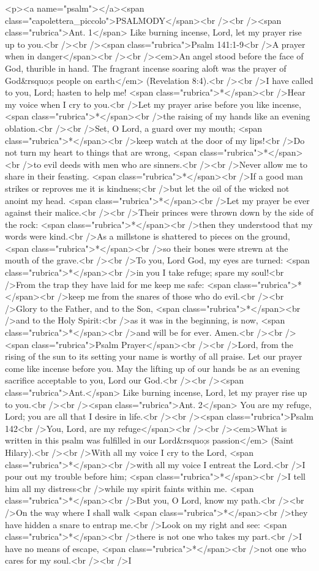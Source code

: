 <p><a name="psalm"></a><span class="capolettera_piccolo">PSALMODY</span><br /><br /><span class="rubrica">Ant. 1</span> Like burning incense, Lord, let my prayer rise up to you.<br /><br /><span class="rubrica">Psalm 141:1-9<br />A prayer when in danger</span><br /><br /><em>An angel stood before the face of God, thurible in hand. The fragrant incense soaring aloft was the prayer of God&rsquo;s people on earth</em> (Revelation 8:4).<br /><br />I have called to you, Lord; hasten to help me! <span class="rubrica">*</span><br />Hear my voice when I cry to you.<br />Let my prayer arise before you like incense, <span class="rubrica">*</span><br />the raising of my hands like an evening oblation.<br /><br />Set, O Lord, a guard over my mouth; <span class="rubrica">*</span><br />keep watch at the door of my lips!<br />Do not turn my heart to things that are wrong, <span class="rubrica">*</span><br />to evil deeds with men who are sinners.<br /><br />Never allow me to share in their feasting. <span class="rubrica">*</span><br />If a good man strikes or reproves me it is kindness;<br />but let the oil of the wicked not anoint my head. <span class="rubrica">*</span><br />Let my prayer be ever against their malice.<br /><br />Their princes were thrown down by the side of the rock: <span class="rubrica">*</span><br />then they understood that my words were kind.<br />As a millstone is shattered to pieces on the ground, <span class="rubrica">*</span><br />so their bones were strewn at the mouth of the grave.<br /><br />To you, Lord God, my eyes are turned: <span class="rubrica">*</span><br />in you I take refuge; spare my soul!<br />From the trap they have laid for me keep me safe: <span class="rubrica">*</span><br />keep me from the snares of those who do evil.<br /><br />Glory to the Father, and to the Son, <span class="rubrica">*</span><br />and to the Holy Spirit:<br />as it was in the beginning, is now, <span class="rubrica">*</span><br />and will be for ever. Amen.<br /><br /><span class="rubrica">Psalm Prayer</span><br /><br />Lord, from the rising of the sun to its setting your name is worthy of all praise. Let our prayer come like incense before you. May the lifting up of our hands be as an evening sacrifice acceptable to you, Lord our God.<br /><br /><span class="rubrica">Ant.</span> Like burning incense, Lord, let my prayer rise up to you.<br /><br /><span class="rubrica">Ant. 2</span> You are my refuge, Lord; you are all that I desire in life.<br /><br /><span class="rubrica">Psalm 142<br />You, Lord, are my refuge</span><br /><br /><em>What is written in this psalm was fulfilled in our Lord&rsquo;s passion</em> (Saint Hilary).<br /><br />With all my voice I cry to the Lord, <span class="rubrica">*</span><br />with all my voice I entreat the Lord.<br />I pour out my trouble before him; <span class="rubrica">*</span><br />I tell him all my distress<br />while my spirit faints within me. <span class="rubrica">*</span><br />But you, O Lord, know my path.<br /><br />On the way where I shall walk <span class="rubrica">*</span><br />they have hidden a snare to entrap me.<br />Look on my right and see: <span class="rubrica">*</span><br />there is not one who takes my part.<br />I have no means of escape, <span class="rubrica">*</span><br />not one who cares for my soul.<br /><br />I 